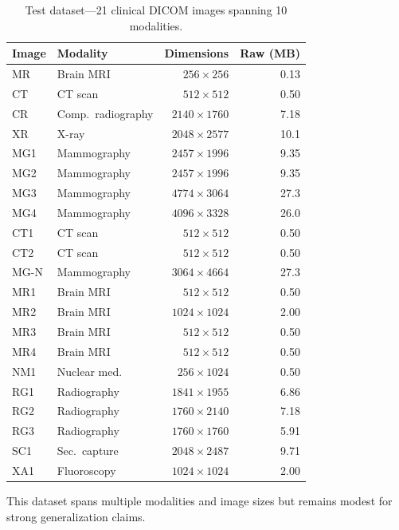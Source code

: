 \documentclass[journal]{IEEEtran}
\begin{document}
\begin{table}[htbp]
\centering
\caption{Test dataset---21 clinical DICOM images spanning 10 modalities.}
\label{tab:dataset}
\scriptsize
\begin{tabular}{llrr}
\toprule
Image & Modality & Dimensions & Raw (MB) \\
\midrule
MR   & Brain MRI      & $256{\times}256$   & 0.13 \\
CT   & CT scan        & $512{\times}512$   & 0.50 \\
CR   & Comp.\ radiography & $2140{\times}1760$ & 7.18 \\
XR   & X-ray          & $2048{\times}2577$ & 10.1 \\
MG1  & Mammography    & $2457{\times}1996$ & 9.35 \\
MG2  & Mammography    & $2457{\times}1996$ & 9.35 \\
MG3  & Mammography    & $4774{\times}3064$ & 27.3 \\
MG4  & Mammography    & $4096{\times}3328$ & 26.0 \\
CT1  & CT scan        & $512{\times}512$   & 0.50 \\
CT2  & CT scan        & $512{\times}512$   & 0.50 \\
MG-N & Mammography    & $3064{\times}4664$ & 27.3 \\
MR1  & Brain MRI      & $512{\times}512$   & 0.50 \\
MR2  & Brain MRI      & $1024{\times}1024$ & 2.00 \\
MR3  & Brain MRI      & $512{\times}512$   & 0.50 \\
MR4  & Brain MRI      & $512{\times}512$   & 0.50 \\
NM1  & Nuclear med.   & $256{\times}1024$  & 0.50 \\
RG1  & Radiography    & $1841{\times}1955$ & 6.86 \\
RG2  & Radiography    & $1760{\times}2140$ & 7.18 \\
RG3  & Radiography    & $1760{\times}1760$ & 5.91 \\
SC1  & Sec.~capture   & $2048{\times}2487$ & 9.71 \\
XA1  & Fluoroscopy    & $1024{\times}1024$ & 2.00 \\
\bottomrule
\end{tabular}
\end{table}

This dataset spans multiple modalities and image sizes but remains modest for
strong generalization claims.
\end{document}
